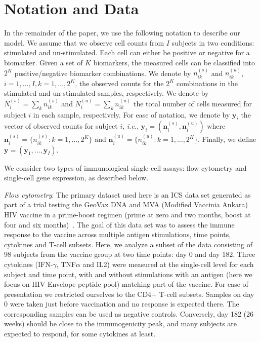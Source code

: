 \documentclass[12pt,oupdraft]{biostatistics}
\begin{document}
\section{Notation and Data}
\label{s:data}

In the remainder of the paper, we use the following notation to describe our model.  We assume that we observe cell counts from $I$ subjects in two conditions: stimulated and un-stimulated. Each cell can either be positive or negative for a biomarker. Given a set of $K$ biomarkers, the measured cells can be classified into $2^K$ positive/negative biomarker combinations. We denote by $n^{(s)}_{ik}$ and $n^{(u)}_{ik}$, $i=1,\dots,I,k=1,\dots, 2^K$, the observed counts for the $2^K$ combinations in the stimulated and un-stimulated samples, respectively. We denote by $N^{(s)}_{i}=\sum_k n^{(s)}_{ik}$ and $N^{(u)}_{i}=\sum_k n^{(u)}_{ik}$ the total number of cells measured for subject $i$ in each sample, respectively. For ease of notation, we denote by $\mathbf{y}_i$ the vector of observed counts for subject $i$, \textit{i.e.}, $\mathbf{y}_{i}=(\mathbf{n}^{(s)}_{i}, \mathbf{n}^{(u)}_{i})$ where $\mathbf{n}^{(s)}_{i}=\{n^{(s)}_{ik}: k=1,\dots,2^K\}$ and $\mathbf{n}^{(u)}_{i}=\{n^{(u)}_{ik}: k=1,\dots,2^K\}$. Finally, we define $\mathbf{y}=(\mathbf{y}_1,\dots,\mathbf{y}_I)$.

We consider two types of immunological single-cell assays: flow cytometry and single-cell gene expression, as described below.

\textit{Flow cytometry}:
The primary dataset used here is an ICS data set generated as part of a  trial testing the GeoVax DNA and MVA (Modified Vaccinia Ankara) HIV vaccine in a prime-boost regimen (prime at zero and two months, boost at four and six months)~\citep{Goepfert:2011ci}.
The goal of this data set was to assess the immune response to the vaccine across multiple antigen stimulations, time points, cytokines and T-cell subsets.
Here, we analyze a subset of the data consisting of 98 subjects from the vaccine group at two time points: day 0 and day 182.
Three cytokines (IFN-$\gamma$, TNF$\alpha$ and IL2) were measured at the single-cell level for each subject and time point, with and without stimulations with an antigen (here we focus on HIV Envelope peptide pool) matching part of the vaccine. For ease of presentation we restricted ourselves to the CD4+ T-cell subsets. Samples on day 0 were taken just before vaccination and no response is expected there. The corresponding samples can be used as negative controls. Conversely, day 182 (26 weeks) should be close to the immunogenicity peak, and many subjects are expected to respond, for some cytokines at least.
\end{document}
